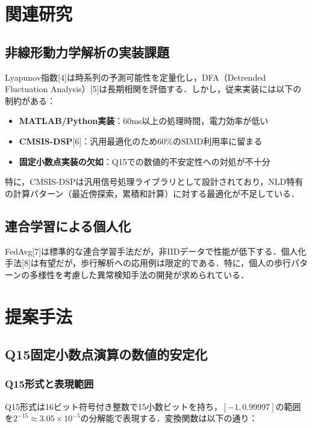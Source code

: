 \documentclass[10pt,twocolumn]{article}
\begin{document}
\begin{CJK}{UTF8}{min}
\section{関連研究}

\subsection{非線形動力学解析の実装課題}

Lyapunov指数[4]は時系列の予測可能性を定量化し，DFA（Detrended Fluctuation Analysis）[5]は長期相関を評価する．しかし，従来実装には以下の制約がある：

\begin{itemize}
\item \textbf{MATLAB/Python実装}：60ms以上の処理時間，電力効率が低い
\item \textbf{CMSIS-DSP}[6]：汎用最適化のため60\%のSIMD利用率に留まる
\item \textbf{固定小数点実装の欠如}：Q15での数値的不安定性への対処が不十分
\end{itemize}

特に，CMSIS-DSPは汎用信号処理ライブラリとして設計されており，NLD特有の計算パターン（最近傍探索，累積和計算）に対する最適化が不足している．

\subsection{連合学習による個人化}

FedAvg[7]は標準的な連合学習手法だが，非IIDデータで性能が低下する．個人化手法[8]は有望だが，歩行解析への応用例は限定的である．特に，個人の歩行パターンの多様性を考慮した異常検知手法の開発が求められている．

\section{提案手法}

\subsection{Q15固定小数点演算の数値的安定化}

\subsubsection{Q15形式と表現範囲}
Q15形式は16ビット符号付き整数で15小数ビットを持ち，$[-1, 0.99997]$の範囲を$2^{-15} \approx 3.05 \times 10^{-5}$の分解能で表現する．変換関数は以下の通り：


\end{CJK}
\end{document}
